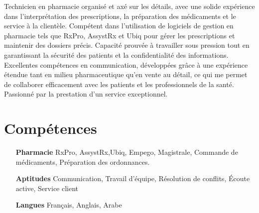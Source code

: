 \documentclass[letterpaper,10pt]{article}
\begin{document}


  Technicien en pharmacie organisé et axé sur les détails, avec une solide expérience dans l’interprétation des prescriptions, la préparation des médicaments et le service à la clientèle. Compétent dans l’utilisation de logiciels de gestion en pharmacie tels que RxPro, AssystRx et Ubiq pour gérer les prescriptions et maintenir des dossiers précis. Capacité prouvée à travailler sous pression tout en garantissant la sécurité des patients et la confidentialité des informations. Excellentes compétences en communication, développées grâce à une expérience étendue tant en milieu pharmaceutique qu’en vente au détail, ce qui me permet de collaborer efficacement avec les patients et les professionnels de la santé. Passionné par la prestation d’un service exceptionnel.


  \section{Compétences}

  \begin{multicols}{2}
    \begin{itemize}[itemsep=-2px, parsep=5pt, leftmargin=75pt]
      \item[\textbf{Pharmacie}]  RxPro, AssystRx,Ubiq, Empego, Magistrale, Commande de médicaments, Préparation des ordonnances.
	  \item[\textbf{Aptitudes}]  Communication, Travail d'équipe, Résolution de conflits, Écoute active, Service client
      \item[\textbf{Langues}]  Français, Anglais, Arabe
    \end{itemize}
  \end{multicols}

\end{document}
